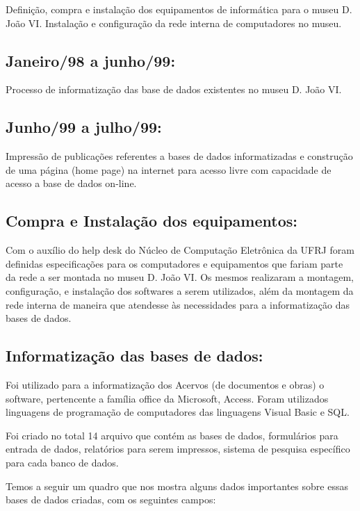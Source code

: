 Definição, compra e instalação dos equipamentos de informática para o museu D. João VI. Instalação e configuração da rede interna de computadores no museu.

\subsection{Janeiro/98 a junho/99:}

Processo de informatização das base de dados existentes no museu D. João VI.

\subsection{Junho/99 a julho/99:}

Impressão de publicações referentes a bases de dados informatizadas e construção de uma página (home page) na internet para acesso livre com capacidade de acesso a base de dados on-line.

\subsection{Compra e Instalação dos equipamentos:}

Com o auxílio do help desk do Núcleo de Computação Eletrônica da UFRJ foram definidas especificações para os computadores e equipamentos que fariam parte da rede a ser montada no museu D. João VI. Os mesmos realizaram a montagem, configuração, e instalação dos softwares a serem utilizados, além da montagem da rede interna de maneira que atendesse às necessidades para a informatização das bases de dados.

\subsection{Informatização das bases de dados:}

Foi utilizado para a informatização dos Acervos (de documentos e obras) o software, pertencente a família office da Microsoft, Access. Foram utilizados linguagens de programação de computadores das linguagens Visual Basic e SQL.

Foi criado no total 14 arquivo que contém as bases de dados, formulários para entrada de dados, relatórios para serem impressos, sistema de pesquisa específico para cada banco de dados.

Temos a seguir um quadro que nos mostra alguns dados importantes sobre essas bases de dados criadas, com os seguintes campos:

